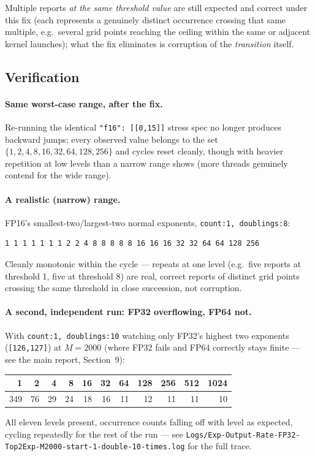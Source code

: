\documentclass[11pt]{article}
\begin{document}
Multiple reports \emph{at the same threshold value} are still expected and correct under
this fix (each represents a genuinely distinct occurrence crossing that same multiple,
e.g.\ several grid points reaching the ceiling within the same or adjacent kernel
launches); what the fix eliminates is corruption of the \emph{transition} itself.

\subsection{Verification}

\paragraph{Same worst-case range, after the fix.} Re-running the identical
\texttt{"f16": [[0,15]]} stress spec no longer produces backward jumps; every
observed value belongs to the set $\{1,2,4,8,16,32,64,128,256\}$ and cycles reset
cleanly, though with heavier repetition at low levels than a narrow range shows (more
threads genuinely contend for the wide range).

\paragraph{A realistic (narrow) range.} FP16's smallest-two/largest-two normal exponents,
\texttt{count:1, doublings:8}:
\begin{lstlisting}[basicstyle=\ttfamily\scriptsize]
1 1 1 1 1 1 1 2 2 4 8 8 8 8 8 16 16 16 32 32 64 64 128 256
\end{lstlisting}
Cleanly monotonic within the cycle --- repeats at one level (e.g.\ five reports at
threshold 1, five at threshold 8) are real, correct reports of distinct grid points
crossing the same threshold in close succession, not corruption.

\paragraph{A second, independent run: FP32 overflowing, FP64 not.} With
\texttt{count:1, doublings:10} watching only FP32's highest two exponents
(\texttt{[126,127]}) at $M{=}2000$ (where FP32 fails and FP64 correctly stays finite ---
see the main report, Section~9):
\begin{center}
\begin{tabular}{rrrrrrrrrrr}
\toprule
1 & 2 & 4 & 8 & 16 & 32 & 64 & 128 & 256 & 512 & 1024 \\
\midrule
349 & 76 & 29 & 24 & 18 & 16 & 11 & 12 & 11 & 11 & 10 \\
\bottomrule
\end{tabular}
\end{center}
All eleven levels present, occurrence counts falling off with level as expected, cycling
repeatedly for the rest of the run --- see
\texttt{Logs/Exp-Output-Rate-FP32-Top2Exp-M2000-start-1-double-10-times.log} for the full
trace.
\end{document}
